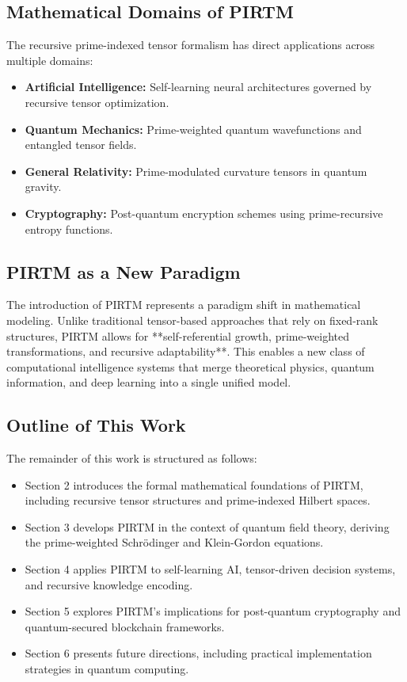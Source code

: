 \documentclass{article}
\theoremstyle{plain}
\begin{document}
\subsection{Mathematical Domains of PIRTM}
The recursive prime-indexed tensor formalism has direct applications across multiple domains:
\begin{itemize}
    \item \textbf{Artificial Intelligence:} Self-learning neural architectures governed by recursive tensor optimization.
    \item \textbf{Quantum Mechanics:} Prime-weighted quantum wavefunctions and entangled tensor fields.
    \item \textbf{General Relativity:} Prime-modulated curvature tensors in quantum gravity.
    \item \textbf{Cryptography:} Post-quantum encryption schemes using prime-recursive entropy functions.
\end{itemize}

\subsection{PIRTM as a New Paradigm}
The introduction of PIRTM represents a paradigm shift in mathematical modeling. Unlike traditional tensor-based approaches that rely on fixed-rank structures, PIRTM allows for **self-referential growth, prime-weighted transformations, and recursive adaptability**. This enables a new class of computational intelligence systems that merge theoretical physics, quantum information, and deep learning into a single unified model.

\subsection{Outline of This Work}
The remainder of this work is structured as follows:
\begin{itemize}
    \item Section 2 introduces the formal mathematical foundations of PIRTM, including recursive tensor structures and prime-indexed Hilbert spaces.
    \item Section 3 develops PIRTM in the context of quantum field theory, deriving the prime-weighted Schrödinger and Klein-Gordon equations.
    \item Section 4 applies PIRTM to self-learning AI, tensor-driven decision systems, and recursive knowledge encoding.
    \item Section 5 explores PIRTM’s implications for post-quantum cryptography and quantum-secured blockchain frameworks.
    \item Section 6 presents future directions, including practical implementation strategies in quantum computing.
\end{itemize}
\end{document}
